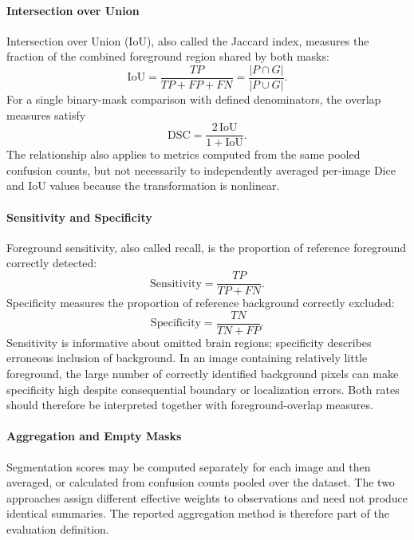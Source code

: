 \paragraph{Intersection over Union}
Intersection over Union (IoU), also called the Jaccard index, measures the fraction of the combined foreground region shared by both masks:
\begin{equation}
\mathrm{IoU}=\frac{TP}{TP+FP+FN}
=\frac{|P\cap G|}{|P\cup G|}.
\end{equation}
For a single binary-mask comparison with defined denominators, the overlap measures satisfy
\begin{equation}
\mathrm{DSC}=\frac{2\,\mathrm{IoU}}{1+\mathrm{IoU}}.
\end{equation}
The relationship also applies to metrics computed from the same pooled confusion counts, but not necessarily to independently averaged per-image Dice and IoU values because the transformation is nonlinear.

\paragraph{Sensitivity and Specificity}
Foreground sensitivity, also called recall, is the proportion of reference foreground correctly detected:
\begin{equation}
\mathrm{Sensitivity}=\frac{TP}{TP+FN}.
\end{equation}
Specificity measures the proportion of reference background correctly excluded:
\begin{equation}
\mathrm{Specificity}=\frac{TN}{TN+FP}.
\end{equation}
Sensitivity is informative about omitted brain regions; specificity describes erroneous inclusion of background. In an image containing relatively little foreground, the large number of correctly identified background pixels can make specificity high despite consequential boundary or localization errors. Both rates should therefore be interpreted together with foreground-overlap measures.

\paragraph{Aggregation and Empty Masks}
Segmentation scores may be computed separately for each image and then averaged, or calculated from confusion counts pooled over the dataset. The two approaches assign different effective weights to observations and need not produce identical summaries. The reported aggregation method is therefore part of the evaluation definition.

